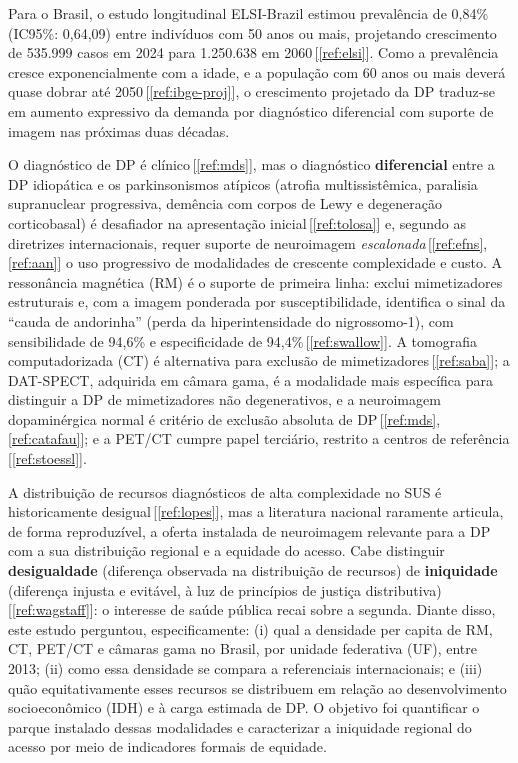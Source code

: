 \documentclass[12pt,a4paper,oneside]{article}
\begin{document}
Para o Brasil, o estudo longitudinal ELSI-Brazil estimou prevalência
de 0,84\% (IC95\%: 0,64,09) entre indivíduos com 50 anos
ou mais, projetando crescimento de 535.999 casos em 2024 para
1.250.638 em 2060\,[\ref{ref:elsi}]. Como a prevalência cresce
exponencialmente com a idade, e a população com 60 anos ou mais deverá
quase dobrar até 2050\,[\ref{ref:ibge-proj}], o crescimento projetado
da DP traduz-se em aumento expressivo da demanda por diagnóstico
diferencial com suporte de imagem nas próximas duas décadas.

O diagnóstico de DP é clínico\,[\ref{ref:mds}], mas o diagnóstico
\textbf{diferencial} entre a DP idiopática e os parkinsonismos
atípicos (atrofia multissistêmica, paralisia supranuclear progressiva,
demência com corpos de Lewy e degeneração corticobasal) é desafiador
na apresentação inicial\,[\ref{ref:tolosa}] e, segundo as diretrizes
internacionais, requer suporte de neuroimagem
\textit{escalonada}\,[\ref{ref:efns}, \ref{ref:aan}] \textemdash{} o
uso progressivo de modalidades de crescente complexidade e custo. A
ressonância magnética (RM) é o suporte de primeira linha: exclui
mimetizadores estruturais e, com a imagem ponderada por
susceptibilidade, identifica o sinal da ``cauda de andorinha'' (perda
da hiperintensidade do nigrossomo-1), com sensibilidade de 94,6\% e
especificidade de 94,4\%\,[\ref{ref:swallow}]. A tomografia
computadorizada (CT) é alternativa para exclusão de
mimetizadores\,[\ref{ref:saba}]; a DAT-SPECT, adquirida em câmara
gama, é a modalidade mais específica para distinguir a DP de
mimetizadores não degenerativos, e a neuroimagem dopaminérgica normal
é critério de exclusão absoluta de DP\,[\ref{ref:mds},
\ref{ref:catafau}]; e a PET/CT cumpre papel terciário, restrito a
centros de referência\,[\ref{ref:stoessl}].

A distribuição de recursos diagnósticos de alta complexidade no SUS é
historicamente desigual\,[\ref{ref:lopes}], mas a literatura nacional
raramente articula, de forma reproduzível, a oferta instalada de
neuroimagem relevante para a DP com a sua distribuição regional e a
equidade do acesso. Cabe distinguir \textbf{desigualdade} (diferença
observada na distribuição de recursos) de \textbf{iniquidade}
(diferença injusta e evitável, à luz de princípios de justiça
distributiva)\,[\ref{ref:wagstaff}]: o interesse de saúde pública
recai sobre a segunda. Diante disso, este estudo perguntou,
especificamente: (i) qual a densidade per capita de RM, CT, PET/CT e
câmaras gama no Brasil, por unidade federativa (UF), entre
2013; (ii) como essa densidade se compara a
referenciais internacionais; e (iii) quão equitativamente esses
recursos se distribuem em relação ao desenvolvimento socioeconômico
(IDH) e à carga estimada de DP. O objetivo foi quantificar o parque
instalado dessas modalidades e caracterizar a iniquidade regional do
acesso por meio de indicadores formais de equidade.
\end{document}
